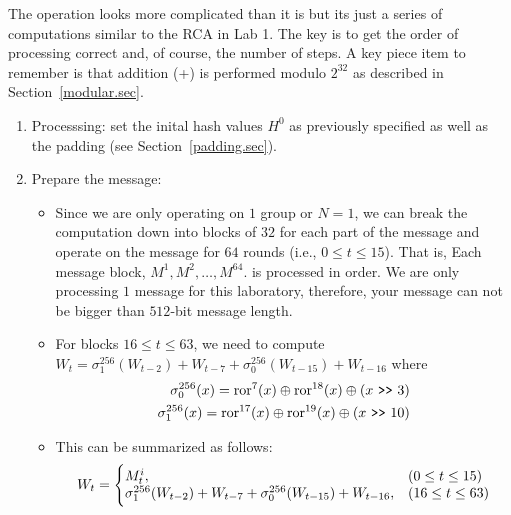 \documentclass{article}
\begin{document}
The operation looks more complicated than it is but its just a series
of computations similar to the RCA in Lab 1.  The key is to get the order of
processing correct and, of course, the number of steps.
A key piece item to remember is that
addition (+) is performed modulo $2^{32}$ as described in Section~\ref{modular.sec}.
\begin{enumerate}
  \item Processsing: set the inital hash values $H^0$ as previously
    specified as well as the padding (see Section~\ref{padding.sec}).
  \item Prepare the message:
    \begin{itemize}
  \item Since we are only operating on $1$ group or $N=1$, we can
    break the computation down into blocks of $32$ for each part
    of the message and operate on the message for $64$ rounds (i.e.,
    $0 \leq t \leq 15$).
    That is, Each message block, $M^1, M^2, \ldots, M^{64}$. 
    is processed in order.  We are only processing $1$ message for
    this laboratory, therefore, your message can not be bigger than
    $512$-bit message length.  
  \item For blocks $16 \leq t \leq 63$, we need to compute
    $W_t = \sigma_1^{256} (W_{t-2}) + W_{t-7} + \sigma_0^{256} (W_{t-15}) + W_{t-16}$
    where
    \begin{eqnarray*}
      \sigma_0^{256}(x) = \text{ror}^{7}(x) \oplus \text{ror}^{18}(x) \oplus (x~\verb!>>!~3)    \\
      \sigma_1^{256}(x) = \text{ror}^{17}(x) \oplus \text{ror}^{19}(x) \oplus (x~\verb!>>!~10)    
    \end{eqnarray*}
  \item This can be summarized as follows:
    \begin{eqnarray*}
      W_t = \Biggl\{
      \begin{array}{@{}ll@{}}
        M_t^i,      & (0 \leq t \leq 15)  \\
        \sigma_1^{256} (W_{t-2}) + W_{t-7} + \sigma_0^{256} (W_{t-15}) +  W_{t-16},  & (16 \leq t \leq 63) 
      \end{array}
    \end{eqnarray*}  
    
    \end{itemize}
    

\end{enumerate}
\end{document}
